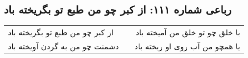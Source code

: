 \begin{center}
\section*{رباعی شماره ۱۱۱: از کبر چو من طبع تو بگریخته باد}
\label{sec:sh111}
\begin{longtable}{l p{0.5cm} r}
از کبر چو من طبع تو بگریخته باد
&&
با خلق چو تو خلق من آمیخته باد
\\
دشمنت چو من به گردن آویخته باد
&&
یا همچو من آب روی او ریخته باد
\\
\end{longtable}
\end{center}
